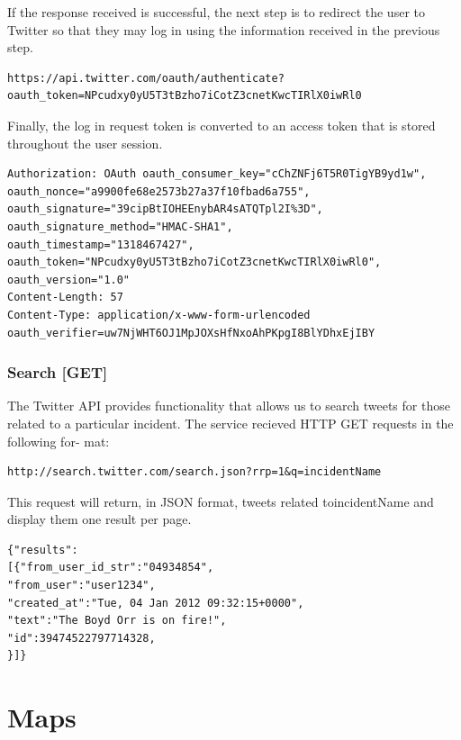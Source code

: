 \documentclass{sig-alt-release2}
\begin{document}
If the response received is successful, the next step is to
redirect the user to Twitter so that they may log in using
the information received in the previous step.

\tiny
\begin{verbatim}
https://api.twitter.com/oauth/authenticate?oauth_token=NPcudxy0yU5T3tBzho7iCotZ3cnetKwcTIRlX0iwRl0
\end{verbatim}
\normalsize

Finally, the log in request token is converted to an access
token that is stored throughout the user session.

\tiny
\begin{verbatim}
Authorization: OAuth oauth_consumer_key="cChZNFj6T5R0TigYB9yd1w",
oauth_nonce="a9900fe68e2573b27a37f10fbad6a755",
oauth_signature="39cipBtIOHEEnybAR4sATQTpl2I%3D",
oauth_signature_method="HMAC-SHA1",
oauth_timestamp="1318467427",
oauth_token="NPcudxy0yU5T3tBzho7iCotZ3cnetKwcTIRlX0iwRl0",
oauth_version="1.0"
Content-Length: 57
Content-Type: application/x-www-form-urlencoded
oauth_verifier=uw7NjWHT6OJ1MpJOXsHfNxoAhPKpgI8BlYDhxEjIBY
\end{verbatim}
\normalsize

\subsubsection{Search [GET]}

The Twitter API provides functionality that allows us to
search tweets for those related to a particular incident. The
service recieved HTTP GET requests in the following for-
mat:

\small
\begin{verbatim}
http://search.twitter.com/search.json?rrp=1&q=incidentName
\end{verbatim}
\normalsize

This request will return, in JSON format, tweets related
toincidentName and display them one result per page.

\begin{verbatim}
{"results":
[{"from_user_id_str":"04934854",
"from_user":"user1234",
"created_at":"Tue, 04 Jan 2012 09:32:15+0000",
"text":"The Boyd Orr is on fire!",
"id":39474522797714328,
}]}
\end{verbatim}

\section{Maps}
\end{document}

